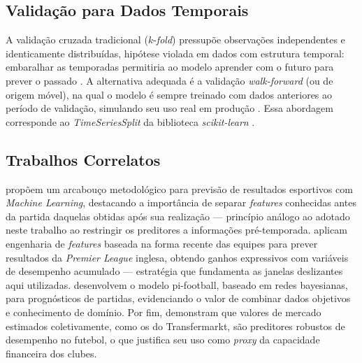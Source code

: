 \documentclass[
    article,
    12pt,
    oneside,
    a4paper,
    english,
    brazilian
    ]{abntex2}
\begin{document}
\subsection{Validação para Dados Temporais}

A validação cruzada tradicional ($k$-\textit{fold}) pressupõe observações independentes e identicamente distribuídas, hipótese violada em dados com estrutura temporal: embaralhar as temporadas permitiria ao modelo aprender com o futuro para prever o passado \cite{bergmeir2012}. A alternativa adequada é a validação \textit{walk-forward} (ou de origem móvel), na qual o modelo é sempre treinado com dados anteriores ao período de validação, simulando seu uso real em produção \cite{tashman2000}. Essa abordagem corresponde ao \textit{TimeSeriesSplit} da biblioteca \textit{scikit-learn} \cite{pedregosa2011}.

\subsection{Trabalhos Correlatos}

 propõem um arcabouço metodológico para previsão de resultados esportivos com \textit{Machine Learning}, destacando a importância de separar \textit{features} conhecidas antes da partida daquelas obtidas após sua realização --- princípio análogo ao adotado neste trabalho ao restringir os preditores a informações pré-temporada.  aplicam engenharia de \textit{features} baseada na forma recente das equipes para prever resultados da \textit{Premier League} inglesa, obtendo ganhos expressivos com variáveis de desempenho acumulado --- estratégia que fundamenta as janelas deslizantes aqui utilizadas.  desenvolvem o modelo pi-football, baseado em redes bayesianas, para prognósticos de partidas, evidenciando o valor de combinar dados objetivos e conhecimento de domínio. Por fim,  demonstram que valores de mercado estimados coletivamente, como os do Transfermarkt, são preditores robustos de desempenho no futebol, o que justifica seu uso como \textit{proxy} da capacidade financeira dos clubes.
\end{document}
